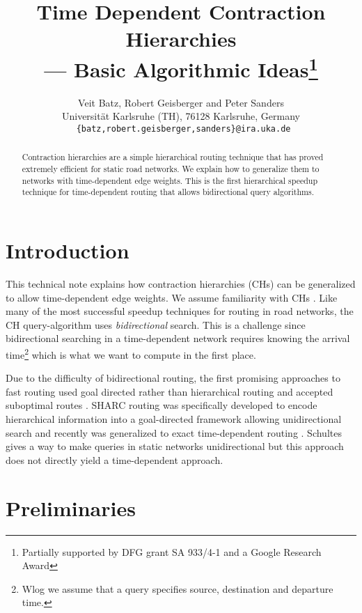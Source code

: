 \documentclass[12pt]{article}
\title{Time Dependent Contraction Hierarchies\\ --- Basic Algorithmic Ideas\thanks{Partially supported by
DFG grant SA 933/4-1 and a Google Research Award}}
\author{Veit Batz, Robert Geisberger and Peter Sanders\\\normalsize
Universit\"at Karlsruhe (TH), 76128 Karlsruhe, Germany\\\normalsize {\tt
\{batz,robert.geisberger,sanders\}@ira.uka.de}}
\begin{document}
\maketitle


\begin{abstract}
Contraction hierarchies are a simple hierarchical routing technique
that has proved extremely efficient for static road networks.
We explain how to generalize them to networks with time-dependent edge weights.
This is the first hierarchical speedup technique for time-dependent routing that
allows bidirectional query algorithms.
\end{abstract}

\section{Introduction}

This technical note explains how contraction hierarchies (CHs) can be
generalized to allow time-dependent edge weights. 
We assume familiarity with CHs
\cite{GSS08b,Gei08}. Like many of the most successful speedup techniques for
routing in road networks, the CH query-algorithm uses
\emph{bidirectional} search.  This is a challenge since bidirectional
searching in a time-dependent network requires knowing the arrival
time\footnote{Wlog we assume that a query specifies source,
destination and departure time.} which is what we want to compute in
the first place.



Due to the difficulty of bidirectional routing, the first promising
approaches to fast routing used goal directed rather than hierarchical
routing and accepted suboptimal routes \cite{NDLS08}.  SHARC routing \cite{BD08}
was specifically developed to encode hierarchical information into a
goal-directed framework allowing unidirectional search and recently
was generalized to exact time-dependent routing \cite{Del08}.
Schultes \cite{Sch08} gives a way to make queries in static
networks unidirectional but this approach does not directly yield 
a time-dependent approach.

\section{Preliminaries}\label{s:preliminaries}
\end{document}
